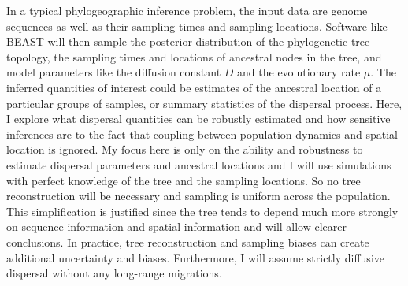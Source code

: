 \documentclass[aps,rmp, twocolumn]{revtex4}
\begin{document}
In a typical phylogeographic inference problem, the input data are genome sequences as well as their sampling times and sampling locations.
Software like BEAST will then sample the posterior distribution of the phylogenetic tree topology, the sampling times and locations of ancestral nodes in the tree, and model parameters like the diffusion constant $D$ and the evolutionary rate $\mu$.
The inferred quantities of interest could be estimates of the ancestral location of a particular groups of samples, or summary statistics of the dispersal process.
Here, I explore what dispersal quantities can be robustly estimated and how sensitive inferences are to the fact that coupling between population dynamics and spatial location is ignored.
My focus here is only on the ability and robustness to estimate dispersal parameters and ancestral locations and I will use simulations with perfect knowledge of the tree and the sampling locations.
So no tree reconstruction will be necessary and sampling is uniform across the population.
This simplification is justified since the tree tends to depend much more strongly on sequence information and spatial information and will allow clearer conclusions.
In practice, tree reconstruction and sampling biases can create additional uncertainty and biases.
Furthermore, I will assume strictly diffusive dispersal without any long-range migrations.
\end{document}

